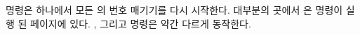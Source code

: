 \cmd{\section} 명령은 하나에서 모든 \cmd{\subsection}의 번호 매기기를 다시 시작한다.
대부분의 곳에서 은 명령이 실행 된 페이지에 있다.
\cmd{\book}, \cmd{\part} 그리고 \cmd{\chapter} 명령은 약간 다르게 동작한다.


